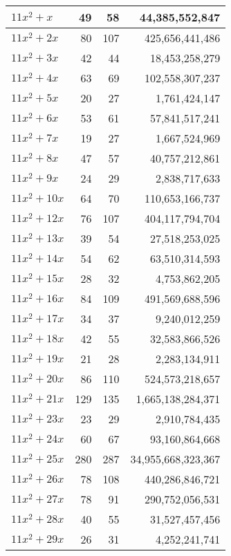 \documentclass[a4paper]{amsproc}
\theoremstyle{plain}
\begin{document}
\begin{longtable}{ | l | r | r | r | }
$11x^2 + x$ & 49 & 58 & 44{,}385{,}552{,}847 \\ \hline
$11x^2 + 2x$ & 80 & 107 & 425{,}656{,}441{,}486 \\ \hline
$11x^2 + 3x$ & 42 & 44 & 18{,}453{,}258{,}279 \\ \hline
$11x^2 + 4x$ & 63 & 69 & 102{,}558{,}307{,}237 \\ \hline
$11x^2 + 5x$ & 20 & 27 & 1{,}761{,}424{,}147 \\ \hline
$11x^2 + 6x$ & 53 & 61 & 57{,}841{,}517{,}241 \\ \hline
$11x^2 + 7x$ & 19 & 27 & 1{,}667{,}524{,}969 \\ \hline
$11x^2 + 8x$ & 47 & 57 & 40{,}757{,}212{,}861 \\ \hline
$11x^2 + 9x$ & 24 & 29 & 2{,}838{,}717{,}633 \\ \hline
$11x^2 + 10x$ & 64 & 70 & 110{,}653{,}166{,}737 \\ \hline
$11x^2 + 12x$ & 76 & 107 & 404{,}117{,}794{,}704 \\ \hline
$11x^2 + 13x$ & 39 & 54 & 27{,}518{,}253{,}025 \\ \hline
$11x^2 + 14x$ & 54 & 62 & 63{,}510{,}314{,}593 \\ \hline
$11x^2 + 15x$ & 28 & 32 & 4{,}753{,}862{,}205 \\ \hline
$11x^2 + 16x$ & 84 & 109 & 491{,}569{,}688{,}596 \\ \hline
$11x^2 + 17x$ & 34 & 37 & 9{,}240{,}012{,}259 \\ \hline
$11x^2 + 18x$ & 42 & 55 & 32{,}583{,}866{,}526 \\ \hline
$11x^2 + 19x$ & 21 & 28 & 2{,}283{,}134{,}911 \\ \hline
$11x^2 + 20x$ & 86 & 110 & 524{,}573{,}218{,}657 \\ \hline
$11x^2 + 21x$ & 129 & 135 & 1{,}665{,}138{,}284{,}371 \\ \hline
$11x^2 + 23x$ & 23 & 29 & 2{,}910{,}784{,}435 \\ \hline
$11x^2 + 24x$ & 60 & 67 & 93{,}160{,}864{,}668 \\ \hline
$11x^2 + 25x$ & 280 & 287 & 34{,}955{,}668{,}323{,}367 \\ \hline
$11x^2 + 26x$ & 78 & 108 & 440{,}286{,}846{,}721 \\ \hline
$11x^2 + 27x$ & 78 & 91 & 290{,}752{,}056{,}531 \\ \hline
$11x^2 + 28x$ & 40 & 55 & 31{,}527{,}457{,}456 \\ \hline
$11x^2 + 29x$ & 26 & 31 & 4{,}252{,}241{,}741 \\ \hline

\end{longtable}
\end{document}
